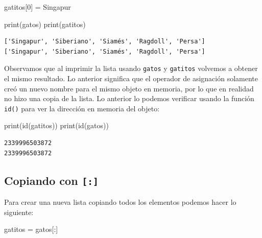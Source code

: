 \documentclass[
  spanish,
  letterpaper,
]{scrbook}
\newenvironment{Shaded}{\begin{snugshade}}{\end{snugshade}}
\newcommand{\BuiltInTok}[1]{\textcolor[rgb]{0.00,0.23,0.31}{#1}}
\newcommand{\DecValTok}[1]{\textcolor[rgb]{0.68,0.00,0.00}{#1}}
\newcommand{\NormalTok}[1]{\textcolor[rgb]{0.00,0.23,0.31}{#1}}
\newcommand{\OperatorTok}[1]{\textcolor[rgb]{0.37,0.37,0.37}{#1}}
\newcommand{\StringTok}[1]{\textcolor[rgb]{0.13,0.47,0.30}{#1}}
\theoremstyle{definition}
\theoremstyle{remark}
\begin{document}
\begin{Shaded}
\begin{Highlighting}[]
\NormalTok{gatitos[}\DecValTok{0}\NormalTok{] }\OperatorTok{=} \StringTok{\textquotesingle{}Singapur\textquotesingle{}}
\end{Highlighting}
\end{Shaded}

\begin{Shaded}
\begin{Highlighting}[]
\BuiltInTok{print}\NormalTok{(gatos)}
\BuiltInTok{print}\NormalTok{(gatitos)}
\end{Highlighting}
\end{Shaded}

\begin{verbatim}
['Singapur', 'Siberiano', 'Siamés', 'Ragdoll', 'Persa']
['Singapur', 'Siberiano', 'Siamés', 'Ragdoll', 'Persa']
\end{verbatim}

Observamos que al imprimir la lista usando \texttt{gatos} y
\texttt{gatitos} volvemos a obtener el mismo resultado. Lo anterior
significa que el operador de asignación solamente creó un nuevo nombre
para el mismo objeto en memoria, por lo que en realidad no hizo una
copia de la lista. Lo anterior lo podemos verificar usando la función
\texttt{id()} para ver la dirección en memoria del objeto:

\begin{Shaded}
\begin{Highlighting}[]
\BuiltInTok{print}\NormalTok{(}\BuiltInTok{id}\NormalTok{(gatitos))}
\BuiltInTok{print}\NormalTok{(}\BuiltInTok{id}\NormalTok{(gatos))}
\end{Highlighting}
\end{Shaded}

\begin{verbatim}
2339996503872
2339996503872
\end{verbatim}

\subsection{\texorpdfstring{Copiando con
\texttt{{[}:{]}}}{Copiando con {[}:{]}}}\label{copiando-con}

Para crear una nueva lista copiando todos los elementos podemos hacer lo
siguiente:

\begin{Shaded}
\begin{Highlighting}[]
\NormalTok{gatitos }\OperatorTok{=}\NormalTok{ gatos[:]}
\end{Highlighting}
\end{Shaded}
\end{document}
